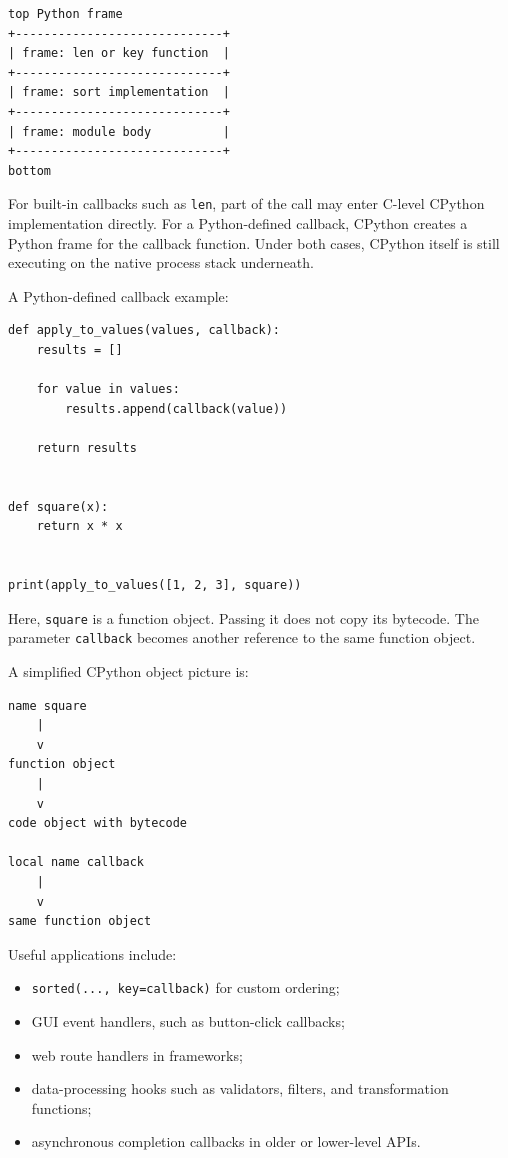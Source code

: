 \begin{verbatim}
top Python frame
+-----------------------------+
| frame: len or key function  |
+-----------------------------+
| frame: sort implementation  |
+-----------------------------+
| frame: module body          |
+-----------------------------+
bottom
\end{verbatim}

For built-in callbacks such as \texttt{len}, part of the call may enter C-level CPython implementation directly. For a Python-defined callback, CPython creates a Python frame for the callback function. Under both cases, CPython itself is still executing on the native process stack underneath.

A Python-defined callback example:

\begin{verbatim}
def apply_to_values(values, callback):
    results = []

    for value in values:
        results.append(callback(value))

    return results


def square(x):
    return x * x


print(apply_to_values([1, 2, 3], square))
\end{verbatim}

Here, \texttt{square} is a function object. Passing it does not copy its bytecode. The parameter \texttt{callback} becomes another reference to the same function object.

A simplified CPython object picture is:

\begin{verbatim}
name square
    |
    v
function object
    |
    v
code object with bytecode

local name callback
    |
    v
same function object
\end{verbatim}

Useful applications include:

\begin{itemize}
    \item \texttt{sorted(..., key=callback)} for custom ordering;
    \item GUI event handlers, such as button-click callbacks;
    \item web route handlers in frameworks;
    \item data-processing hooks such as validators, filters, and transformation functions;
    \item asynchronous completion callbacks in older or lower-level APIs.
\end{itemize}

